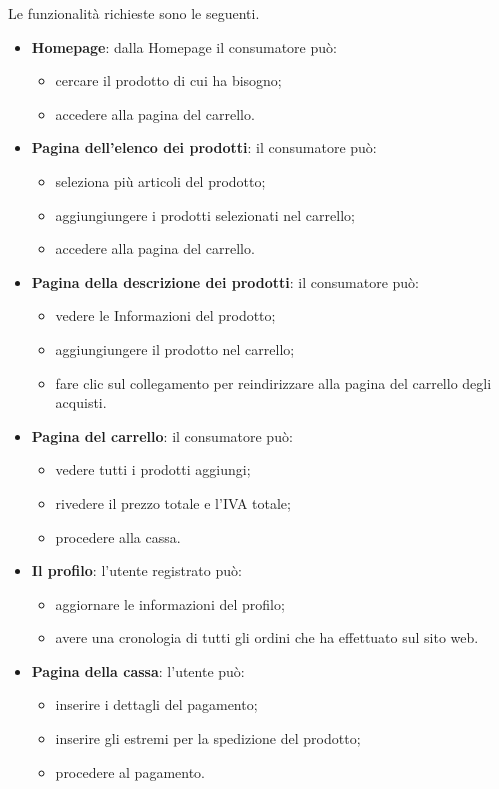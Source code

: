 Le funzionalità richieste sono le seguenti.

\begin{itemize}
    \item {\textbf{Homepage}}: dalla Homepage il consumatore può:
        \begin{itemize}
            \item cercare il prodotto di cui ha bisogno;
            \item accedere alla pagina del carrello.
        \end{itemize}
    \item {\textbf{Pagina dell'elenco dei prodotti}}: il consumatore può:
        \begin{itemize}
            \item seleziona più articoli del prodotto;
            \item aggiungiungere i prodotti selezionati nel carrello;
            \item accedere alla pagina del carrello.
        \end{itemize}
    \item {\textbf{Pagina della descrizione dei prodotti}}: il consumatore può:
        \begin{itemize}
            \item vedere le Informazioni del prodotto;
            \item aggiungiungere il prodotto nel carrello;
            \item fare clic sul collegamento per reindirizzare alla pagina del carrello degli acquisti.
        \end{itemize}
    \item {\textbf{Pagina del carrello}}: il consumatore può:
        \begin{itemize}
            \item vedere tutti i prodotti aggiungi;
            \item rivedere il prezzo totale e l'IVA totale;
            \item procedere alla cassa.
        \end{itemize}
    \item {\textbf{Il profilo}}: l'utente registrato può:
        \begin{itemize}
            \item aggiornare le informazioni del profilo;
            \item avere una cronologia di tutti gli ordini che ha effettuato sul sito web.
        \end{itemize}
    \item {\textbf{Pagina della cassa}}: l'utente può:
        \begin{itemize}
            \item inserire i dettagli del pagamento;
            \item inserire gli estremi per la spedizione del prodotto;
            \item procedere al pagamento.
        \end{itemize}
\end{itemize}
